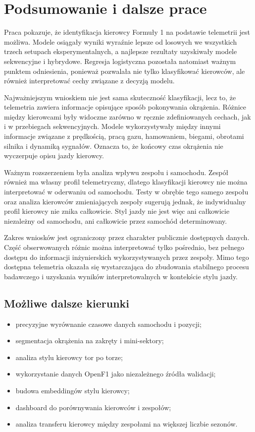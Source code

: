 \documentclass[printmode,pl]{mgr}
\begin{document}
\chapter{Podsumowanie i dalsze prace}

Praca pokazuje, że identyfikacja kierowcy Formuły 1 na podstawie telemetrii jest możliwa. Modele osiągały wyniki wyraźnie lepsze od losowych we wszystkich trzech setupach eksperymentalnych, a najlepsze rezultaty uzyskiwały modele sekwencyjne i hybrydowe. Regresja logistyczna pozostała natomiast ważnym punktem odniesienia, ponieważ pozwalała nie tylko klasyfikować kierowców, ale również interpretować cechy związane z decyzją modelu.

Najważniejszym wnioskiem nie jest sama skuteczność klasyfikacji, lecz to, że telemetria zawiera informacje opisujące sposób pokonywania okrążenia. Różnice między kierowcami były widoczne zarówno w ręcznie zdefiniowanych cechach, jak i w przebiegach sekwencyjnych. Modele wykorzystywały między innymi informacje związane z prędkością, pracą gazu, hamowaniem, biegami, obrotami silnika i dynamiką sygnałów. Oznacza to, że końcowy czas okrążenia nie wyczerpuje opisu jazdy kierowcy.

Ważnym rozszerzeniem była analiza wpływu zespołu i samochodu. Zespół również ma własny profil telemetryczny, dlatego klasyfikacji kierowcy nie można interpretować w oderwaniu od samochodu. Testy w obrębie tego samego zespołu oraz analiza kierowców zmieniających zespoły sugerują jednak, że indywidualny profil kierowcy nie znika całkowicie. Styl jazdy nie jest więc ani całkowicie niezależny od samochodu, ani całkowicie przez samochód determinowany.

Zakres wniosków jest ograniczony przez charakter publicznie dostępnych danych. Część obserwowanych różnic można interpretować tylko pośrednio, bez pełnego dostępu do informacji inżynierskich wykorzystywanych przez zespoły. Mimo tego dostępna telemetria okazała się wystarczająca do zbudowania stabilnego procesu badawczego i uzyskania wyników interpretowalnych w kontekście stylu jazdy.

\section{Możliwe dalsze kierunki}

\begin{itemize}
    \item precyzyjne wyrównanie czasowe danych samochodu i pozycji;
    \item segmentacja okrążenia na zakręty i mini-sektory;
    \item analiza stylu kierowcy tor po torze;
    \item wykorzystanie danych OpenF1 jako niezależnego źródła walidacji;
    \item budowa embeddingów stylu kierowcy;
    \item dashboard do porównywania kierowców i zespołów;
    \item analiza transferu kierowcy między zespołami na większej liczbie sezonów.
\end{itemize}

\cleardoublepage
\printbibliography[heading=bibintoc,title={Literatura}]

\end{document}
